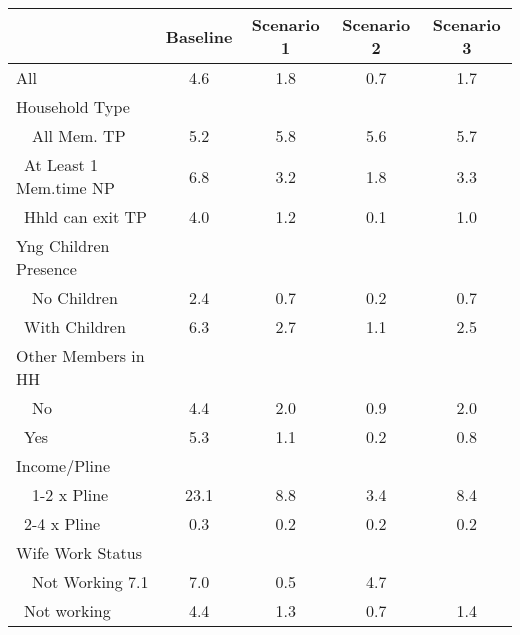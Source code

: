 \begin{tabular}{l*{4}{c}}
\hline\hline
            &    Baseline&  Scenario 1&  Scenario 2&  Scenario 3\\
\hline
All         &           4.6&         1.8&         0.7&         1.7\\
\midrule

Household Type      & \multicolumn{4}{c}{} \\ 
\ \ All Mem. TP         &         5.2&         5.8&         5.6&         5.7\\
\ At Least 1 Mem.time NP&         6.8&         3.2&         1.8&         3.3\\
\ Hhld can exit TP&               4.0&         1.2&         0.1&         1.0\\

\midrule

Yng Children Presence & \multicolumn{4}{c}{} \\ 
\ \ No Children &         2.4&         0.7&         0.2&         0.7\\
\ With Children&         6.3&         2.7&         1.1&         2.5\\
\midrule

Other Members in HH      & \multicolumn{4}{c}{} \\ 
\ \ No      &         4.4&         2.0&         0.9&         2.0\\
\ Yes       &         5.3&         1.1&         0.2&         0.8\\

\midrule

Income/Pline     & \multicolumn{4}{c}{} \\ 
\ \ 1-2 x Pline&         23.1&         8.8&         3.4&         8.4\\
\ 2-4 x Pline&           0.3&          0.2&         0.2&         0.2\\

\midrule

Wife Work Status  & \multicolumn{4}{c}{} \\ 
\ \ Not Working         7.1&         7.0&         0.5&         4.7\\
\ Not working&          4.4&         1.3&         0.7&         1.4\\

\hline\hline
\end{tabular}
